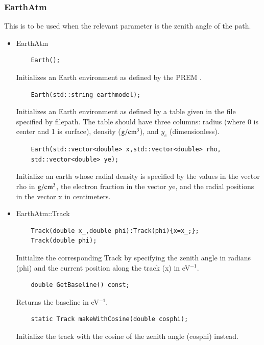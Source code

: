 \documentclass[3p,12pt]{elsarticle}
\newcommand{\ttf}{\ttfamily}
\begin{document}
\subsubsection{EarthAtm\label{sec:earthatm}}
This is to be used when the relevant parameter is the zenith angle of
the path.
\begin{itemize}
\item {\ttf EarthAtm}
  \begin{lstlisting}
    Earth();
  \end{lstlisting}
  Initializes an {\ttf Earth} environment as defined by the PREM \citep{dziewonski1981preliminary}.
  \begin{lstlisting}
    Earth(std::string earthmodel);
  \end{lstlisting}
  Initializes an {\ttf Earth} environment as defined by a table given in the file specified by {\ttf filepath}. The table should have three columns: radius (where 0 is center and 1 is surface), density (${\rm g}/{\rm cm}^3$), and $y_e$ (dimensionless). 
  \begin{lstlisting}
    Earth(std::vector<double> x,std::vector<double> rho,
    std::vector<double> ye);
  \end{lstlisting}
  Initialize an {\ttf earth} whose radial density is specified by the
  values in the vector {\ttf rho} in ${\rm g}/{\rm cm}^3$, the
  electron fraction in the vector {\ttf ye}, and the radial positions
  in the vector {\ttf x} in centimeters. 

\item {\ttf EarthAtm::Track}
  \begin{lstlisting}
    Track(double x_,double phi):Track(phi){x=x_;};
    Track(double phi);
  \end{lstlisting}
  Initialize the corresponding {\ttf Track} by specifying the zenith
  angle in radians ({\ttf phi}) and the current position along the
  track ({\ttf x}) in eV$^{-1}$.
  
  \begin{lstlisting}
    double GetBaseline() const;
  \end{lstlisting}
  Returns the baseline in eV$^{-1}$.

  \begin{lstlisting}
    static Track makeWithCosine(double cosphi);
  \end{lstlisting}
  Initialize the track with the cosine of the zenith angle ({\ttf cosphi}) instead. 
  
\end{itemize}
\end{document}
